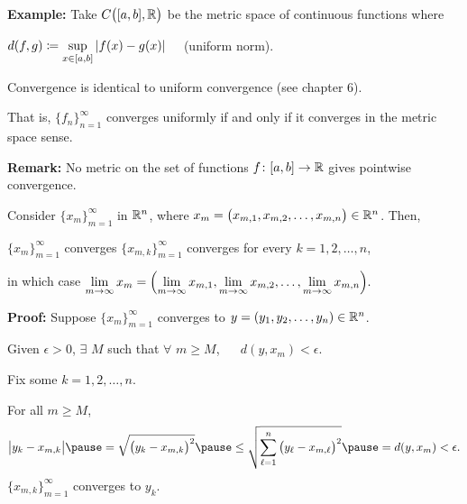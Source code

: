 \documentclass[10pt,aspectratio=169]{beamer}
\begin{document}
\begin{frame}

\textbf{Example:}
Take $C\bigl([a,b],{\mathbb{R}}\bigr)$ be the metric space of continuous functions
where

$d(f,g) \coloneqq \sup\limits_{x \in [a,b]} \left\lvert {f(x)-g(x)} \right\rvert$ ~~(uniform norm).

\medskip
\pause

Convergence is identical to uniform convergence (see chapter 6).

\medskip

That is, $\{ f_n \}_{n=1}^\infty$ converges uniformly if and only
if it converges in the metric space sense.

\medskip
\pause

\textbf{Remark:}
No metric on the set of functions $f \colon [a,b] \to {\mathbb{R}}$
gives pointwise convergence.

\end{frame}

\begin{frame}

\begin{proposition}
Consider $\{ x_m \}_{m=1}^\infty$ in ${\mathbb{R}}^n$,
where $x_m = \bigl(x_{m,1},x_{m,2},\ldots,x_{m,n}\bigr) \in {\mathbb{R}}^n$.
\pause
Then,

 $\{ x_m \}_{m=1}^\infty$ converges \wiffif
$\{ x_{m,k} \}_{m=1}^\infty$ converges for every $k=1,2,\ldots,n$,

\medskip
\pause
in which case
\qquad
$\displaystyle
\lim_{m\to\infty}
x_m =
\Bigl(
\lim_{m\to\infty} x_{m,1},
\lim_{m\to\infty} x_{m,2},
\ldots,
\lim_{m\to\infty} x_{m,n}
\Bigr) .
$
\end{proposition}

\pause

\textbf{Proof:}
Suppose
$\{ x_m \}_{m=1}^\infty$ converges to
$y = (y_1,y_2,\ldots,y_n) \in {\mathbb{R}}^n$.

\pause
\medskip

Given $\epsilon > 0$, $\exists$ $M$ such that $\forall$ $m \geq M$, ~~
$d(y,x_m) < \epsilon$.

\pause
\medskip

Fix some $k=1,2,\ldots,n$.

\pause
For all $m \geq M$,
\begin{equation*}
\bigl\lvert y_k - x_{m,k} \bigr\rvert
\pause
=
\sqrt{{\bigl(y_k - x_{m,k} \bigr)}^2}
\pause
\leq
\sqrt{\sum_{\ell=1}^n {\bigl(y_\ell-x_{m,\ell}\bigr)}^2}
\pause
= d(y,x_m) < \epsilon .
\end{equation*}
\pause
\thus \quad $\{ x_{m,k} \}_{m=1}^\infty$ converges to $y_k$.

\end{frame}
\end{document}

